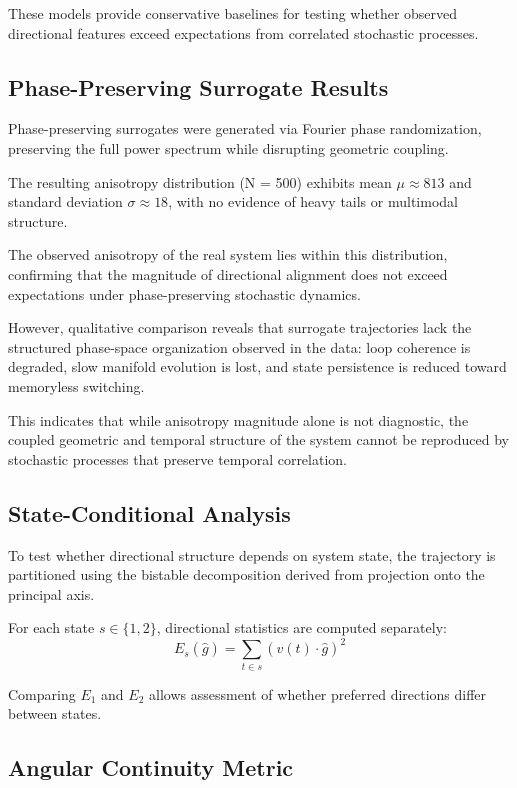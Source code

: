 \documentclass[twocolumn,9pt]{revtex4-2}
\begin{document}
These models provide conservative baselines for testing whether observed directional features
exceed expectations from correlated stochastic processes.

\subsection{Phase-Preserving Surrogate Results}
\label{subsec:phase_surrogate_results}

Phase-preserving surrogates were generated via Fourier
phase randomization, preserving the full power spectrum
while disrupting geometric coupling.

The resulting anisotropy distribution (N = 500) exhibits
mean $\mu \approx 813$ and standard deviation
$\sigma \approx 18$, with no evidence of heavy tails
or multimodal structure.

The observed anisotropy of the real system lies within
this distribution, confirming that the magnitude of
directional alignment does not exceed expectations under
phase-preserving stochastic dynamics.

However, qualitative comparison reveals that surrogate
trajectories lack the structured phase-space organization
observed in the data: loop coherence is degraded, slow
manifold evolution is lost, and state persistence is
reduced toward memoryless switching.

This indicates that while anisotropy magnitude alone is
not diagnostic, the coupled geometric and temporal
structure of the system cannot be reproduced by stochastic
processes that preserve temporal correlation.

\subsection{State-Conditional Analysis}
\label{subsec:state_conditional_analysis}

To test whether directional structure depends on system state, the trajectory is partitioned using
the bistable decomposition derived from projection onto the principal axis.

For each state $s \in \{1,2\}$, directional statistics are computed separately:
\[
E_s(\hat{g}) = \sum_{t \in s} (v(t) \cdot \hat{g})^2
\]

Comparing $E_1$ and $E_2$ allows assessment of whether preferred directions differ between states.

\subsection{Angular Continuity Metric}
\label{subsec:angular_continuity_metric}
\end{document}
